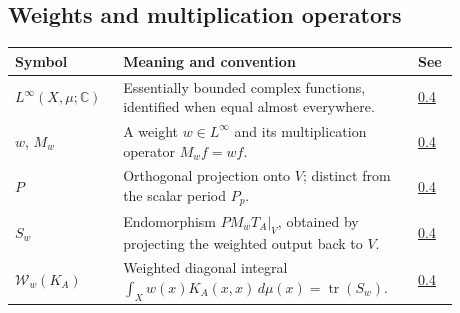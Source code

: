 \subsection*{Weights and multiplication operators}\label{v1a-notation-weights}

\begin{longtable}{p{0.22\linewidth}p{0.58\linewidth}p{0.08\linewidth}}
\textbf{Symbol} & \textbf{Meaning and convention} & \textbf{See} \\ \hline
\(L^\infty(X,\mu;\mathbb C)\) & Essentially bounded complex functions, identified when equal almost everywhere. & \hyperref[weighted-finite-trace]{0.4} \\
\(w\), \(M_w\) & A weight \(w\in L^\infty\) and its multiplication operator \(M_wf=wf\). & \hyperref[weighted-finite-trace]{0.4} \\
\(P\) & Orthogonal projection onto \(V\); distinct from the scalar period \(P_p\). & \hyperref[weighted-finite-trace]{0.4} \\
\(S_w\) & Endomorphism \(P M_wT_A|_V\), obtained by projecting the weighted output back to \(V\). & \hyperref[finite-weighted-kernel-identity]{0.4} \\
\(\mathcal W_w(K_A)\) & Weighted diagonal integral \(\int_Xw(x)K_A(x,x)\,d\mu(x)=\operatorname{tr}(S_w)\). & \hyperref[weighted-finite-trace]{0.4} \\
\end{longtable}
